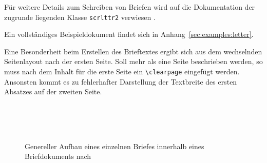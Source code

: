 Für weitere Details zum Schreiben von Briefen wird auf die Dokumentation
der zugrunde liegenden Klasse \lstinline{scrlttr2} verwiesen
\cite[S.162ff]{koma-skript}.

Ein vollständiges Beispieldokument findet sich in Anhang~\ref{sec:examples:letter}.

\begin{important}
Eine Besonderheit beim Erstellen des Brieftextes ergibt sich aus dem wechselnden
Seitenlayout nach der ersten Seite.
Soll mehr als eine Seite beschrieben werden, so muss nach
dem Inhalt für die erste Seite ein \lstinline{\clearpage} eingefügt werden.
Ansonsten kommt es zu fehlerhafter Darstellung der Textbreite des ersten
Absatzes auf der zweiten Seite.
\end{important}


\begin{figure}[!ht]
  \centering\small
  \\[1pt]
  \\[1pt]
  \\[\dp\strutbox]
  \caption[Genereller Aufbau eines einzelnen Briefes innerhalb eines
    Briefdokuments]{Genereller Aufbau eines einzelnen Briefes
    innerhalb eines Briefdokuments nach \cite[S.171]{koma-skript} }
  \label{fig:scrlttr2.letter}
\end{figure}



